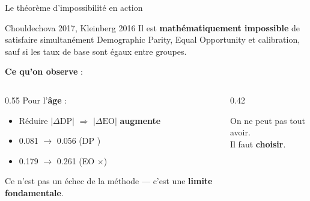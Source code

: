 \documentclass[aspectratio=169, 11pt]{beamer}
\begin{document}
\begin{frame}{Le th\'eor\`eme d'impossibilit\'e en action}
\begin{alertblock}{Chouldechova 2017, Kleinberg 2016}
Il est \textbf{math\'ematiquement impossible} de satisfaire simultan\'ement Demographic Parity, Equal Opportunity et calibration, sauf si les taux de base sont \'egaux entre groupes.
\end{alertblock}

\vspace{0.5em}
\textbf{Ce qu'on observe} :

\begin{columns}[T]
\begin{column}{0.55\textwidth}
Pour l'\textbf{\^age} :
\begin{itemize}
    \item R\'eduire $|\Delta\text{DP}|$ $\Rightarrow$ $|\Delta\text{EO}|$ \textbf{augmente}
    \item 0.081 $\to$ 0.056 (DP \checkmark)
    \item 0.179 $\to$ 0.261 (EO $\times$)
\end{itemize}

\vspace{0.3em}
Ce n'est pas un \'echec de la m\'ethode --- c'est une \textbf{limite fondamentale}.
\end{column}
\begin{column}{0.42\textwidth}
\centering
{}

\vspace{0.3em}
\scriptsize On ne peut pas tout avoir.\\Il faut \textbf{choisir}.
\end{column}
\end{columns}
\end{frame}

\end{document}
